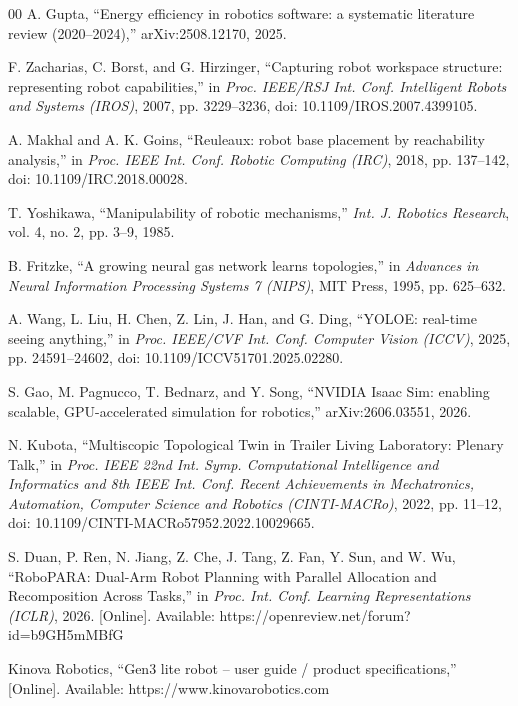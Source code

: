 \documentclass[conference]{IEEEtran}
\begin{document}
{\begin{thebibliography}{00}
A. Gupta, ``Energy efficiency in robotics software: a systematic literature review (2020--2024),'' arXiv:2508.12170, 2025.

F. Zacharias, C. Borst, and G. Hirzinger, ``Capturing robot workspace structure: representing robot capabilities,'' in \textit{Proc. IEEE/RSJ Int. Conf. Intelligent Robots and Systems (IROS)}, 2007, pp. 3229--3236, doi: 10.1109/IROS.2007.4399105.

A. Makhal and A. K. Goins, ``Reuleaux: robot base placement by reachability analysis,'' in \textit{Proc. IEEE Int. Conf. Robotic Computing (IRC)}, 2018, pp. 137--142, doi: 10.1109/IRC.2018.00028.

T. Yoshikawa, ``Manipulability of robotic mechanisms,'' \textit{Int. J. Robotics Research}, vol. 4, no. 2, pp. 3--9, 1985.

B. Fritzke, ``A growing neural gas network learns topologies,'' in \textit{Advances in Neural Information Processing Systems 7 (NIPS)}, MIT Press, 1995, pp. 625--632.

A. Wang, L. Liu, H. Chen, Z. Lin, J. Han, and G. Ding, ``YOLOE: real-time seeing anything,'' in \textit{Proc. IEEE/CVF Int. Conf. Computer Vision (ICCV)}, 2025, pp. 24591--24602, doi: 10.1109/ICCV51701.2025.02280.

S. Gao, M. Pagnucco, T. Bednarz, and Y. Song, ``NVIDIA Isaac Sim: enabling scalable, GPU-accelerated simulation for robotics,'' arXiv:2606.03551, 2026.

N. Kubota, ``Multiscopic Topological Twin in Trailer Living Laboratory: Plenary Talk,'' in \textit{Proc. IEEE 22nd Int. Symp. Computational Intelligence and Informatics and 8th IEEE Int. Conf. Recent Achievements in Mechatronics, Automation, Computer Science and Robotics (CINTI-MACRo)}, 2022, pp. 11--12, doi: 10.1109/CINTI-MACRo57952.2022.10029665.

S. Duan, P. Ren, N. Jiang, Z. Che, J. Tang, Z. Fan, Y. Sun, and W. Wu, ``RoboPARA: Dual-Arm Robot Planning with Parallel Allocation and Recomposition Across Tasks,'' in \textit{Proc. Int. Conf. Learning Representations (ICLR)}, 2026. [Online]. Available: https://openreview.net/forum?id=b9GH5mMBfG

Kinova Robotics, ``Gen3 lite robot -- user guide / product specifications,'' [Online]. Available: https://www.kinovarobotics.com


\end{thebibliography}}
\end{document}
